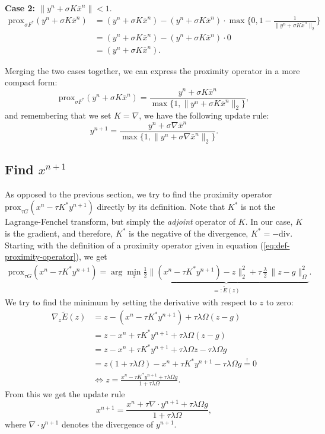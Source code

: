 \documentclass{paper}
\newcommand{\prox}{\text{prox}}
\begin{document}
\textbf{Case 2: $\|y^n + \sigma K \bar x^n\| < 1.$}
\begin{align*}
\prox_{\sigma F^*}(y^n + \sigma K \bar x^n) &=  (y^n + \sigma K \bar x^n) - (y^n + \sigma K \bar x^n) \cdot \max\{0, 1 - \frac{1}{\|y^n + \sigma K \bar x^n\|_2}\} \\
&= (y^n + \sigma K \bar x^n) - (y^n + \sigma K \bar x^n) \cdot 0 \\
&= (y^n + \sigma K \bar x^n).
\end{align*}

Merging the two cases together, we can express the proximity operator in a more compact form:
$$\prox_{\sigma F^*}(y^n + \sigma K \bar x^n) = \frac{y^n + \sigma K \bar x^n}{\max\{1,\|y^n + \sigma K \bar x^n\|_2\}},$$
and remembering that we set $K = \nabla$, we have the following update rule:
\begin{equation}
 y^{n+1} = \frac{y^n + \sigma \nabla \bar x^n}{\max\{1,\|y^n + \sigma \nabla \bar x^n\|_2\}}.
 \label{eq:update-y}
\end{equation}

\subsection{Find $x^{n+1}$}
As opposed to the previous section, we try to find the proximity operator $\prox_{\tau G}(x^n - \tau K^* y^{n+1})$ directly by its definition. Note that $K^*$ is not the Lagrange-Fenchel transform, but simply the \emph{adjoint} operator of $K$. In our case, $K$ is the gradient, and therefore, $K^*$ is the negative of the divergence, $K^* = - \text{div}$. Starting with the definition of a proximity operator given in equation (\ref{eq:def-proximity-operator}), we get 
\begin{align*}
 \prox_{\tau G}(x^n - \tau K^* y^{n+1}) = \arg\min_z \underbrace{\frac{1}{2} \|(x^n - \tau K^* y^{n+1})-z\|_2^2 + \tau \, \frac{\lambda}{2} \, \|z-g\|_\Omega^2}_{=: \tilde E(z)}.
\end{align*}
We try to find the minimum by setting the derivative with respect to $z$ to zero:
\begin{align*}
 \nabla_z \tilde E(z) &= z - (x^n - \tau K^* y^ {n+1}) + \tau \lambda \Omega (z-g) \\
 &= z - x^n + \tau K^* y^{n+1} + \tau \lambda \Omega (z-g) \\
 &= z - x^n + \tau K^* y^{n+1} + \tau \lambda \Omega z -\tau \lambda \Omega g \\
 &= z(1 + \tau \lambda \Omega) - x^n + \tau K^* y^{n+1} - \tau \lambda \Omega g \stackrel{!}{=} 0 \\
 &\Longleftrightarrow z = \frac{x^n - \tau K^* y^{n+1} + \tau \lambda \Omega g}{1 + \tau \lambda \Omega}.
\end{align*}
From this we get the update rule
\begin{equation}x^{n+1} = \frac{x^n + \tau \nabla \cdot y^{n+1} + \tau \lambda \Omega g}{1 + \tau \lambda \Omega},
\label{eq:update-x}
\end{equation}
where $\nabla \cdot y^{n+1}$ denotes the divergence of $y^{n+1}$.
\end{document}
